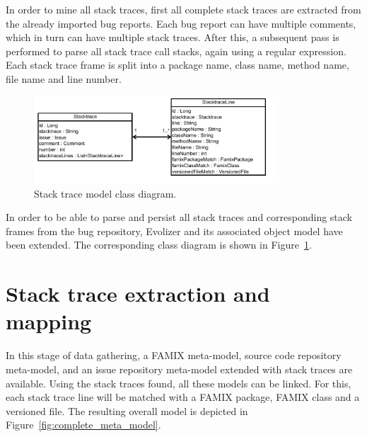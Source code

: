 In order to mine all stack traces, first all complete stack traces are extracted from the already imported bug reports. Each bug report can have multiple comments, which in turn can have multiple stack traces. After this, a subsequent pass is performed to parse all stack trace call stacks, again using a regular expression. Each stack trace frame is split into a package name, class name, method name, file name and line number.

\begin{figure}[!ht]
	\centering
		\includegraphics[width=0.8\textwidth]{img/stacktracemodel.pdf}
	\caption{Stack trace model class diagram.}
	\label{fig:stacktrace_model}
\end{figure}

In order to be able to parse and persist all stack traces and corresponding stack frames from the bug repository, Evolizer and its associated object model have been extended. The corresponding class diagram is shown in Figure~\ref{fig:stacktrace_model}.


\section{Stack trace extraction and mapping} %
\label{sec:stack_trace_extraction_and_mapping}
In this stage of data gathering, a FAMIX meta-model, source code repository meta-model, and an issue repository meta-model extended with stack traces are  available. Using the stack traces found, all these models can be linked. For this, each stack trace line will be matched with a FAMIX package, FAMIX class and a versioned file. The resulting overall model is depicted in Figure~\ref{fig:complete_meta_model}.

